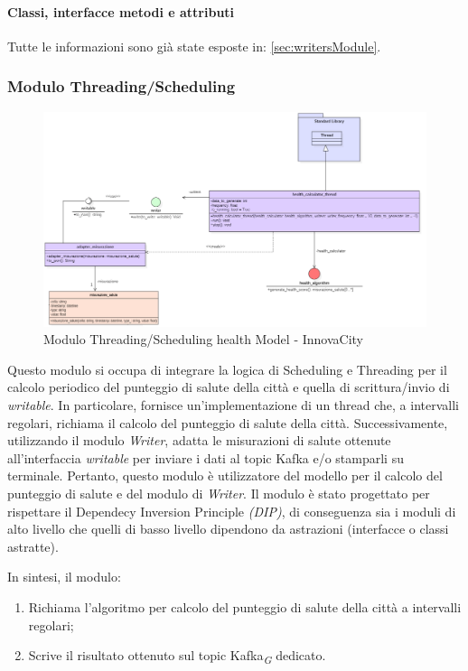\paragraph*{Classi, interfacce metodi e attributi}
Tutte le informazioni sono già state esposte in: \ref{sec:writersModule}.

\subsubsection{Modulo Threading/Scheduling}
\begin{figure}[H]
    \centering
    \includegraphics[width=1\textwidth]{../Images/SpecificaTecnica/healthThreading.PNG}
    \caption{Modulo Threading/Scheduling health Model - InnovaCity}
    \label{fig: threadHealth}
\end{figure}

Questo modulo si occupa di integrare la logica di Scheduling e Threading per il calcolo periodico del punteggio di salute della città e quella di scrittura/invio di \textit{writable}. In particolare, fornisce un'implementazione di un thread che, a intervalli regolari, richiama il calcolo del punteggio di salute della città. Successivamente, utilizzando il modulo \textit{Writer}, adatta le misurazioni di salute ottenute all'interfaccia \textit{writable} per inviare i dati al topic Kafka e/o stamparli su terminale. Pertanto, questo modulo è utilizzatore del modello per il calcolo del punteggio di salute e del modulo di \textit{Writer}.
Il modulo è stato progettato per rispettare il Dependecy Inversion Principle \textit{(DIP)}, di conseguenza sia i moduli di alto livello che quelli di basso livello dipendono da astrazioni (interfacce o classi astratte).

In sintesi, il modulo:
    \begin{enumerate}
        \item Richiama l'algoritmo per calcolo del punteggio di salute della città a intervalli regolari;
        \item Scrive il risultato ottenuto sul topic Kafka\textsubscript{\textit{G}} dedicato.
    \end{enumerate}

